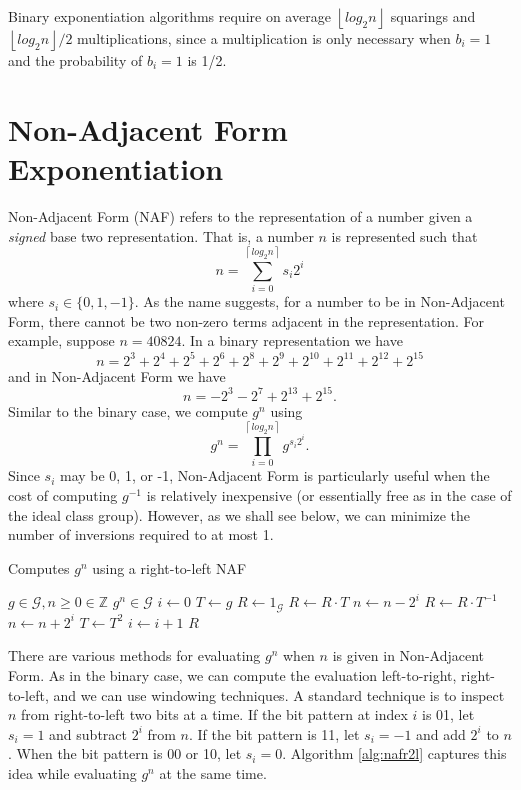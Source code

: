 \documentclass{ucalgthes1}
\theoremstyle{plain}
\theoremstyle{definition}
\newcommand{\ZZ}{\mathbb{Z}}
\newcommand{\floor}[1]{\left\lfloor #1 \right\rfloor}
\newcommand{\ceil}[1]{\left\lceil #1 \right\rceil}
\begin{document}
Binary exponentiation algorithms require on average $\floor{log_2 n}$ squarings and $\floor{log_2 n}/2$ multiplications, since a multiplication is only necessary when $b_i = 1$ and the probability of $b_i = 1$ is 1/2.

\bigbreak
\section{Non-Adjacent Form Exponentiation}

Non-Adjacent Form (NAF) refers to the representation of a number given a \emph{signed} base two representation.  That is, a number $n$ is represented such that
\[
	n = \sum_{i=0}^{\ceil{log_2 n}} s_i 2^i
\]
where $s_i \in \{0, 1, -1\}$.  As the name suggests, for a number to be in Non-Adjacent Form, there cannot be two non-zero terms adjacent in the representation.  For example, suppose $n = 40824$.  In a binary representation we have
\[
	n = 2^3+2^4+2^5+2^6+2^8+2^9+2^{10}+2^{11}+2^{12}+2^{15}
\]
and in Non-Adjacent Form we have
\[
	n = -2^3-2^7+2^{13}+2^{15}.
\]
Similar to the binary case, we compute $g^n$ using
\[
	g^n = \prod _{i=0}^{\ceil{log_2 n}} g^{s_i 2^i}.
\]
Since $s_i$ may be 0, 1, or -1, Non-Adjacent Form is particularly useful when the cost of computing $g^{-1}$ is relatively inexpensive (or essentially free as in the case of the ideal class group).  However, as we shall see below, we can minimize the number of inversions required to at most 1.

\bigbreak
\begin{algorithm}[h]
\caption{Computes $g^n$ using a right-to-left NAF}\label{alg:nafr2l}
\begin{algorithmic}[1]
\REQUIRE $g \in \mathcal G, n \ge 0 \in \ZZ$
\ENSURE $g^n \in \mathcal G$
\STATE $i \gets 0$
\STATE $T \gets g$ 
\STATE $R \gets 1_{\mathcal G}$
	\IF {$\floor{n/2^i} \equiv 1 \pmod 4$}
		\STATE $R \gets R \cdot T$
		\STATE $n \gets n-2^i$
	\ELSIF {$\floor{n/2^i} \equiv 3 \pmod 4$}
		\STATE $R \gets R \cdot T^{-1}$
		\STATE $n \gets n+2^i$
	\ENDIF
	\STATE $T \gets T^2$
	\STATE $i \gets i + 1$
\ENDWHILE
\RETURN $R$
\end{algorithmic}
\end{algorithm}

There are various methods for evaluating $g^n$ when $n$ is given in Non-Adjacent Form.  As in the binary case, we can compute the evaluation left-to-right, right-to-left, and we can use windowing techniques.  A standard technique is to inspect $n$ from right-to-left two bits at a time.  If the bit pattern at index $i$ is 01, let $s_i = 1$ and subtract $2^i$ from $n$.  If the bit pattern is 11, let $s_i = -1$ and add $2^i$ to $n$.  When the bit pattern is 00 or 10, let $s_i =0$.  Algorithm \ref{alg:nafr2l} captures this idea while evaluating $g^n$ at the same time.
\end{document}
